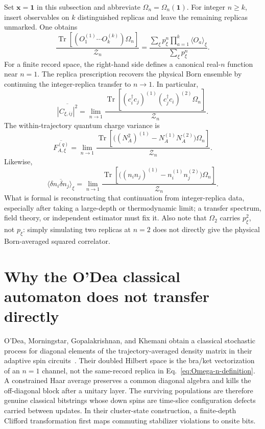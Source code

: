 \documentclass[
  aps,prx,twocolumn,superscriptaddress,longbibliography,
  nofootinbib,floatfix
]{revtex4-2}
\newcommand{\Tr}{\operatorname{Tr}}
\newcommand{\cZ}{\mathcal{Z}}
\newcommand{\avg}[1]{\overline{#1}}
\theoremstyle{plain}
\theoremstyle{definition}
\begin{document}
Set \(\bm x=\mathbf{1}\) in this subsection and abbreviate
\(\Omega_n=\Omega_n(\mathbf{1})\).
For integer \(n\geq k\), insert observables on \(k\) distinguished replicas
and leave the remaining replicas unmarked.  One obtains
\begin{equation}
 \frac{\Tr[(O_1^{(1)}\cdots O_k^{(k)})\Omega_n]}{\cZ_n}
 =\frac{\sum_\xi p_\xi^n\prod_{a=1}^{k}\langle O_a\rangle_\xi}
 {\sum_\xi p_\xi^n}.
 \label{eq:marked-replica-master}
\end{equation}
For a finite record space, the right-hand side defines a canonical real-\(n\)
function near \(n=1\).  The replica prescription recovers the physical Born
ensemble by continuing the integer-replica transfer to \(n\to1\).  In
particular,
\begin{equation}
 \boxed{
 \avg{|C_{\xi,ij}|^2}
 =\lim_{n\to1}
 \frac{\Tr[(c_i^\dagger c_j)^{(1)}
 (c_j^\dagger c_i)^{(2)}\Omega_n]}{\cZ_n}.}
 \label{eq:marked-squared-correlator}
\end{equation}
The within-trajectory quantum charge variance is
\begin{equation}
 \boxed{
 \avg{F_{A,\xi}^{(q)}}
 =\lim_{n\to1}
 \frac{\Tr\!\left[
 \bigl((N_A^2)^{(1)}-N_A^{(1)}N_A^{(2)}\bigr)\Omega_n
 \right]}{\cZ_n}.}
 \label{eq:marked-charge-variance}
\end{equation}
Likewise,
\begin{equation}
 \avg{\langle\delta n_i\delta n_j\rangle_\xi}
 =\lim_{n\to1}
 \frac{\Tr\!\left[
 \bigl((n_in_j)^{(1)}-n_i^{(1)}n_j^{(2)}\bigr)\Omega_n
 \right]}{\cZ_n}.
 \label{eq:marked-density-correlation}
\end{equation}
What is formal is reconstructing that continuation from integer-replica data,
especially after taking a large-depth or thermodynamic limit; a transfer
spectrum, field theory, or independent estimator must fix it.  Also note that
\(\Omega_2\) carries \(p_\xi^2\), not \(p_\xi\): simply simulating two replicas
at \(n=2\) does not directly give the physical Born-averaged squared
correlator.

\section{Why the O'Dea classical automaton does not transfer directly}
\label{sec:odea-comparison}

O'Dea, Morningstar, Gopalakrishnan, and Khemani obtain a classical stochastic
process for diagonal elements of the trajectory-averaged density matrix in
their adaptive spin circuits~\cite{ODeaMorningstarGopalakrishnan2024}.  Their
doubled Hilbert space is the bra/ket vectorization of an \(n=1\) channel, not
the same-record replica in Eq.~\eqref{eq:Omega-n-definition}.  A constrained
Haar average preserves a common diagonal algebra and kills the off-diagonal
block after a unitary layer.  The surviving populations are therefore genuine
classical bitstrings whose down spins are time-slice configuration defects
carried between updates.  In their
cluster-state construction, a finite-depth Clifford transformation first maps
commuting stabilizer violations to onsite bits.
\end{document}
